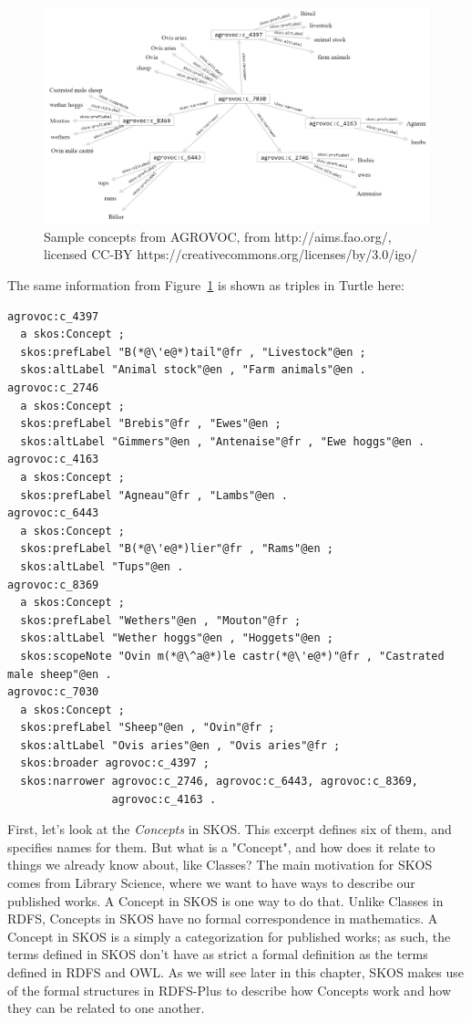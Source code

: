 \begin{figure}
\centering
\includegraphics[width=5in]{SWWOv3/media/ch11/figure11-1.png}
\caption{Sample concepts from AGROVOC, from http://aims.fao.org/, licensed CC-BY https://creativecommons.org/licenses/by/3.0/igo/}
\label{fig:ch11.1}
\end{figure}


The same information from Figure~\ref{fig:ch11.1} is shown as triples in Turtle
here:

\begin{lstlisting}
agrovoc:c_4397
  a skos:Concept ;
  skos:prefLabel "B(*@\'e@*)tail"@fr , "Livestock"@en ;
  skos:altLabel "Animal stock"@en , "Farm animals"@en .
agrovoc:c_2746
  a skos:Concept ;
  skos:prefLabel "Brebis"@fr , "Ewes"@en ;
  skos:altLabel "Gimmers"@en , "Antenaise"@fr , "Ewe hoggs"@en .
agrovoc:c_4163
  a skos:Concept ;
  skos:prefLabel "Agneau"@fr , "Lambs"@en .
agrovoc:c_6443
  a skos:Concept ;
  skos:prefLabel "B(*@\'e@*)lier"@fr , "Rams"@en ;
  skos:altLabel "Tups"@en .
agrovoc:c_8369
  a skos:Concept ;
  skos:prefLabel "Wethers"@en , "Mouton"@fr ;
  skos:altLabel "Wether hoggs"@en , "Hoggets"@en ;
  skos:scopeNote "Ovin m(*@\^a@*)le castr(*@\'e@*)"@fr , "Castrated male sheep"@en .
agrovoc:c_7030
  a skos:Concept ;
  skos:prefLabel "Sheep"@en , "Ovin"@fr ;
  skos:altLabel "Ovis aries"@en , "Ovis aries"@fr ;
  skos:broader agrovoc:c_4397 ;
  skos:narrower agrovoc:c_2746, agrovoc:c_6443, agrovoc:c_8369,
                agrovoc:c_4163 .
\end{lstlisting}

First, let's look at the \textit{Concepts} in SKOS. This excerpt defines six of them, and specifies
names for them.  But what is a "Concept", and how does it relate to things we already know about, 
like Classes?  The main motivation for SKOS comes from Library Science, where we want to have ways to describe our 
published works.  A Concept in SKOS is one way to do that.  Unlike Classes in RDFS, Concepts in SKOS have no formal correspondence in mathematics. A Concept in SKOS is a simply a categorization for published works; as such, the terms defined in SKOS don't have as strict a formal definition as the terms defined in RDFS and OWL.  As we will see later in this chapter, SKOS makes use of the formal structures in RDFS-Plus to describe how Concepts work and how they can be related to one another. 


